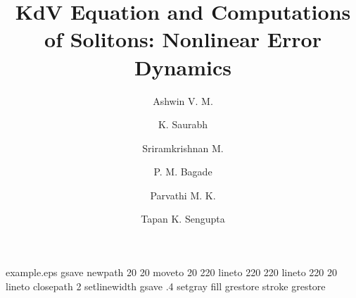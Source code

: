 \begin{filecontents*}{example.eps}
gsave
newpath
  20 20 moveto
  20 220 lineto
  220 220 lineto
  220 20 lineto
closepath
2 setlinewidth
gsave
  .4 setgray fill
grestore
stroke
grestore
\end{filecontents*}
\RequirePackage{fix-cm}
\documentclass[smallcondensed]{svjour3}     %
%
\smartqed  %
%
\usepackage{amsmath}
\DeclareMathOperator{\sech}{sech}
\usepackage{graphicx}
\usepackage{subfig}
\graphicspath{{../Fig/}}




\title{KdV Equation and Computations of Solitons: Nonlinear Error Dynamics}


\author{Ashwin V. M.\and K. Saurabh \and Sriramkrishnan M.\and  P. M. Bagade\and Parvathi M. K. \and Tapan K. Sengupta }




\maketitle

